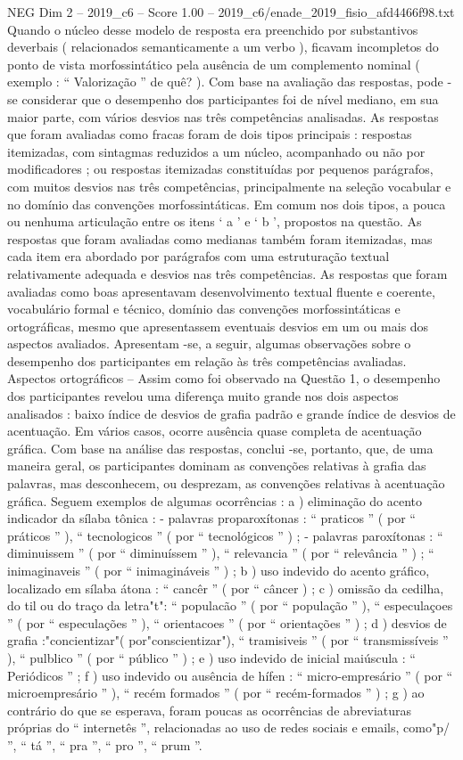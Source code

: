 \begin{textsample}{NEG Dim 2 – 2019\_c6 – Score 1.00 – 2019\_c6/enade\_2019\_fisio\_afd4466f98.txt}
Quando o núcleo desse modelo de resposta era preenchido por substantivos deverbais ( relacionados semanticamente a um verbo ), ficavam incompletos do ponto de vista morfossintático pela ausência de um complemento nominal ( exemplo : “ Valorização ” de quê? ).
Com base na avaliação das respostas, pode -se considerar que o desempenho dos participantes foi de nível mediano, em sua maior parte, com vários desvios nas três competências analisadas.
As respostas que foram avaliadas como fracas foram de dois tipos principais : respostas itemizadas, com sintagmas reduzidos a um núcleo, acompanhado ou não por modificadores ; ou respostas itemizadas constituídas por pequenos parágrafos, com muitos desvios nas três competências, principalmente na seleção vocabular e no domínio das convenções morfossintáticas.
Em comum nos dois tipos, a pouca ou nenhuma articulação entre os itens ‘ a ’ e ‘ b ’, propostos na questão.
As respostas que foram avaliadas como medianas também foram itemizadas, mas cada item era abordado por parágrafos com uma estruturação textual relativamente adequada e desvios nas três competências.
As respostas que foram avaliadas como boas apresentavam desenvolvimento textual fluente e coerente, vocabulário formal e técnico, domínio das convenções morfossintáticas e ortográficas, mesmo que apresentassem eventuais desvios em um ou mais dos aspectos avaliados.
Apresentam -se, a seguir, algumas observações sobre o desempenho dos participantes em relação às três competências avaliadas.
Aspectos ortográficos – Assim como foi observado na Questão 1, o desempenho dos participantes revelou uma diferença muito grande nos dois aspectos analisados : baixo índice de desvios de grafia padrão e grande índice de desvios de acentuação.
Em vários casos, ocorre ausência quase completa de acentuação gráfica.
Com base na análise das respostas, conclui -se, portanto, que, de uma maneira geral, os participantes dominam as convenções relativas à grafia das palavras, mas desconhecem, ou desprezam, as convenções relativas à acentuação gráfica.
Seguem exemplos de algumas ocorrências : a ) eliminação do acento indicador da sílaba tônica : - palavras proparoxítonas : “ praticos ” ( por “ práticos ” ), “ tecnologicos ” ( por “ tecnológicos ” ) ; - palavras paroxítonas : “ diminuissem ” ( por “ diminuíssem ” ), “ relevancia ” ( por “ relevância ” ) ; “ inimaginaveis ” ( por “ inimagináveis ” ) ; b ) uso indevido do acento gráfico, localizado em sílaba átona : “ cancêr ” ( por “ câncer ) ; c ) omissão da cedilha, do til ou do traço da letra"t": “ populacão ” ( por “ população ” ), “ especulaçoes ” ( por “ especulações ” ), “ orientacoes ” ( por “ orientações ” ) ; d ) desvios de grafia :"concientizar"( por"conscientizar"), “ tramisiveis ” ( por “ transmissíveis ” ), “ pulblico ” ( por “ público ” ) ; e ) uso indevido de inicial maiúscula : “ Periódicos ” ; f ) uso indevido ou ausência de hífen : “ micro-empresário ” ( por “ microempresário ” ), “ recém formados ” ( por “ recém-formados ” ) ; g ) ao contrário do que se esperava, foram poucas as ocorrências de abreviaturas próprias do “ internetês ”, relacionadas ao uso de redes sociais e emails, como"p/ ”, “ tá ”, “ pra ”, “ pro ”, “ prum ”.

\end{textsample}
